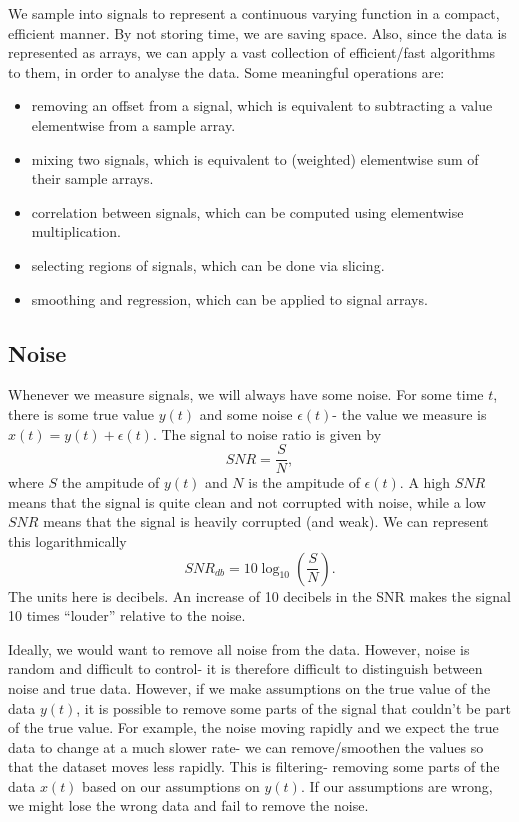 \documentclass[a4paper, openany]{memoir}
\begin{document}
We sample into signals to represent a continuous varying function in a compact, efficient manner. By not storing time, we are saving space. Also, since the data is represented as arrays, we can apply a vast collection of efficient/fast algorithms to them, in order to analyse the data. Some meaningful operations are:
\begin{itemize}
    \item removing an offset from a signal, which is equivalent to subtracting a value elementwise from a sample array.
    \item mixing two signals, which is equivalent to (weighted) elementwise sum of their sample arrays.
    \item correlation between signals, which can be computed using elementwise multiplication.
    \item selecting regions of signals, which can be done via slicing.
    \item smoothing and regression, which can be applied to signal arrays.
\end{itemize}

\subsection{Noise}
Whenever we measure signals, we will always have some noise. For some time $t$, there is some true value $y(t)$ and some noise $\epsilon(t)$- the value we measure is $x(t) = y(t) + \epsilon(t)$. The signal to noise ratio is given by
\[SNR = \frac{S}{N},\]
where $S$ the ampitude of $y(t)$ and $N$ is the ampitude of $\epsilon(t)$. A high $SNR$ means that the signal is quite clean and not corrupted with noise, while a low $SNR$ means that the signal is heavily corrupted (and weak). We can represent this logarithmically
\[SNR_{db} = 10 \log_{10} \left(\frac{S}{N}\right).\]
The units here is decibels. An increase of 10 decibels in the SNR makes the signal 10 times ``louder'' relative to the noise.

Ideally, we would want to remove all noise from the data. However, noise is random and difficult to control- it is therefore difficult to distinguish between noise and true data. However, if we make assumptions on the true value of the data $y(t)$, it is possible to remove some parts of the signal that couldn't be part of the true value. For example, the noise moving rapidly and we expect the true data to change at a much slower rate- we can remove/smoothen the values so that the dataset moves less rapidly. This is filtering- removing some parts of the data $x(t)$ based on our assumptions on $y(t)$. If our assumptions are wrong, we might lose the wrong data and fail to remove the noise.
\end{document}

